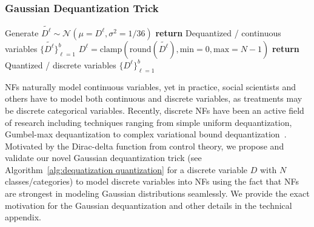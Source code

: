 \documentclass[letterpaper]{article} %
\begin{document}
\subsubsection{Gaussian Dequantization Trick}
\begin{algorithm}[tb!]
\caption{Gaussian Dequantization and Quantization}
\label{alg:dequatization quantization}
\begin{algorithmic}[1] %
\label{alg:dequatization}
\State Generate $\tilde{D^\ell} \sim \mathcal{N}(\mu={D}^{\ell},\sigma^2=1/36)$%
\State \textbf{return} Dequantized / continuous variables $\{\tilde{D^\ell}\}^b_{\ell{ = }1}$
\EndProcedure%
\label{alg:quatization}
\State ${D}^{\ell} = \mathrm{clamp}(\mathrm{round}(\tilde{D^\ell}), \mathrm{min}{ = }0, \mathrm{max}{ = }N{ - }1)$%
\State \textbf{return} Quantized / discrete variables $\{{D^\ell}\}^b_{\ell{ = }1}$
\EndProcedure%
\end{algorithmic}
\end{algorithm}
NFs naturally model continuous variables, yet  in practice, social scientists and others have to model both continuous and discrete variables, as treatments may be discrete categorical variables.
Recently, discrete NFs have been an active field of research including techniques ranging from simple uniform dequantization, Gumbel-max dequantization to complex variational bound dequantization~\cite{Uria2013RNADETR_uniformdeq, Hoogeboom2019IDF, Tran2019IDF, ho2019flow++, ZieglerR2019VAE_dequant, Ma2019Macow, Nielsen2020DeqGap, Pawlowski2020DSCM_CI}.
Motivated by the Dirac-delta function from control theory, we propose and validate our novel Gaussian dequantization trick (see Algorithm~\ref{alg:dequatization quantization} for a discrete variable $D$ with $N$ classes/categories) to model discrete variables into NFs using the fact that NFs are strongest in modeling Gaussian distributions seamlessly. We provide the exact motivation for the Gaussian dequantization and other details in the technical appendix.
\end{document}
